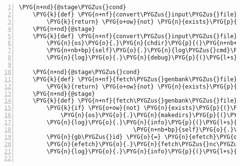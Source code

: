 \begin{Verbatim}[commandchars=\\\{\},numbers=left,firstnumber=1,stepnumber=5]
    \PYG{n+nd}{@stage\PYGZus{}cond}
    \PYG{k}{def} \PYG{n+nf}{convert\PYGZus{}input\PYGZus{}file}\PYG{p}{(}\PYG{n+nb+bp}{self}\PYG{p}{)}\PYG{p}{:}
        \PYG{k}{return} \PYG{o+ow}{not} \PYG{n}{exists}\PYG{p}{(}\PYG{n+nb+bp}{self}\PYG{o}{.}\PYG{n}{analysis}\PYG{o}{.}\PYG{n}{inputfile\PYGZus{}fq\PYGZus{}path}\PYG{p}{)}
    \PYG{n+nd}{@stage}
    \PYG{k}{def} \PYG{n+nf}{convert\PYGZus{}input\PYGZus{}file}\PYG{p}{(}\PYG{n+nb+bp}{self}\PYG{p}{)}\PYG{p}{:}
        \PYG{n}{os}\PYG{o}{.}\PYG{n}{chdir}\PYG{p}{(}\PYG{n+nb+bp}{self}\PYG{o}{.}\PYG{n}{analysis}\PYG{o}{.}\PYG{n}{input\PYGZus{}data\PYGZus{}dir}\PYG{p}{)}
        \PYG{n+nb+bp}{self}\PYG{o}{.}\PYG{n}{log\PYGZus{}cmd}\PYG{p}{(}\PYG{l+s}{"}\PYG{l+s}{fastq-dump}\PYG{l+s}{"}\PYG{p}{,} \PYG{n+nb+bp}{self}\PYG{o}{.}\PYG{n}{analysis}\PYG{o}{.}\PYG{n}{inputfile\PYGZus{}name}\PYG{p}{)}
        \PYG{n}{log}\PYG{o}{.}\PYG{n}{debug}\PYG{p}{(}\PYG{l+s}{"}\PYG{l+s}{created }\PYG{l+s+si}{\PYGZpc{}s}\PYG{l+s}{"} \PYG{o}{\PYGZpc{}} \PYG{n+nb+bp}{self}\PYG{o}{.}\PYG{n}{analysis}\PYG{o}{.}\PYG{n}{inputfile\PYGZus{}fq\PYGZus{}path}\PYG{p}{)}

    \PYG{n+nd}{@stage\PYGZus{}cond}
    \PYG{k}{def} \PYG{n+nf}{fetch\PYGZus{}genbank\PYGZus{}file}\PYG{p}{(}\PYG{n+nb+bp}{self}\PYG{p}{)}\PYG{p}{:}
        \PYG{k}{return} \PYG{o+ow}{not} \PYG{n}{exists}\PYG{p}{(}\PYG{n+nb+bp}{self}\PYG{o}{.}\PYG{n}{analysis}\PYG{o}{.}\PYG{n}{genbankfile\PYGZus{}path}\PYG{p}{)}
    \PYG{n+nd}{@stage}
    \PYG{k}{def} \PYG{n+nf}{fetch\PYGZus{}genbank\PYGZus{}file}\PYG{p}{(}\PYG{n+nb+bp}{self}\PYG{p}{)}\PYG{p}{:}
        \PYG{k}{if} \PYG{o+ow}{not} \PYG{n}{exists}\PYG{p}{(}\PYG{n+nb+bp}{self}\PYG{o}{.}\PYG{n}{analysis}\PYG{o}{.}\PYG{n}{genbank\PYGZus{}data\PYGZus{}dir}\PYG{p}{)}\PYG{p}{:}
            \PYG{n}{os}\PYG{o}{.}\PYG{n}{makedirs}\PYG{p}{(}\PYG{n+nb+bp}{self}\PYG{o}{.}\PYG{n}{analysis}\PYG{o}{.}\PYG{n}{genbank\PYGZus{}data\PYGZus{}dir}\PYG{p}{)}
        \PYG{n}{log}\PYG{o}{.}\PYG{n}{info}\PYG{p}{(}\PYG{l+s}{"}\PYG{l+s}{Fetching }\PYG{l+s}{'}\PYG{l+s+si}{\PYGZpc{}s}\PYG{l+s}{'}\PYG{l+s}{ from entrez...}\PYG{l+s}{"} \PYG{o}{\PYGZpc{}}
                                 \PYG{n+nb+bp}{self}\PYG{o}{.}\PYG{n}{analysis}\PYG{o}{.}\PYG{n}{org\PYGZus{}accession}\PYG{p}{)}
        \PYG{n}{gb\PYGZus{}id} \PYG{o}{=} \PYG{n}{efetch}\PYG{o}{.}\PYG{n}{get\PYGZus{}nc\PYGZus{}id}\PYG{p}{(}\PYG{n+nb+bp}{self}\PYG{o}{.}\PYG{n}{analysis}\PYG{o}{.}\PYG{n}{org\PYGZus{}accession}\PYG{p}{)}
        \PYG{n}{efetch}\PYG{o}{.}\PYG{n}{fetch\PYGZus{}nc\PYGZus{}gb}\PYG{p}{(}\PYG{n}{gb\PYGZus{}id}\PYG{p}{,} \PYG{n+nb}{open}\PYG{p}{(}\PYG{n+nb+bp}{self}\PYG{o}{.}\PYG{n}{analysis}\PYG{o}{.}\PYG{n}{genbankfile\PYGZus{}path}\PYG{p}{,} \PYG{l+s}{"}\PYG{l+s}{w}\PYG{l+s}{"}\PYG{p}{)}\PYG{p}{)}
        \PYG{n}{log}\PYG{o}{.}\PYG{n}{info}\PYG{p}{(}\PYG{l+s}{"}\PYG{l+s}{...done}\PYG{l+s}{"}\PYG{p}{)}


\end{Verbatim}
